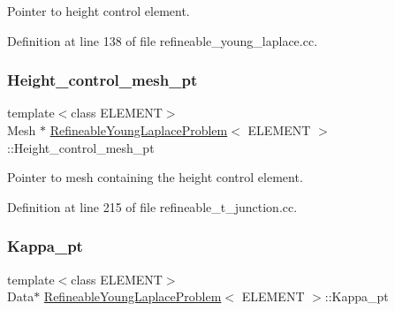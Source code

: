 Pointer to height control element. 



Definition at line 138 of file refineable\+\_\+young\+\_\+laplace.\+cc.

\mbox{\label{classRefineableYoungLaplaceProblem_ae2ae72b9b685c052b6a86892f64c2d85}} 
\subsubsection{\texorpdfstring{Height\+\_\+control\+\_\+mesh\+\_\+pt}{Height\_control\_mesh\_pt}}
{\footnotesize\ttfamily template$<$class E\+L\+E\+M\+E\+NT$>$ \\
Mesh $\ast$ \hyperlink{classRefineableYoungLaplaceProblem}{Refineable\+Young\+Laplace\+Problem}$<$ E\+L\+E\+M\+E\+NT $>$\+::Height\+\_\+control\+\_\+mesh\+\_\+pt\hspace{0.3cm}{\ttfamily [private]}}



Pointer to mesh containing the height control element. 



Definition at line 215 of file refineable\+\_\+t\+\_\+junction.\+cc.

\mbox{\label{classRefineableYoungLaplaceProblem_a0d667f8f0c41048740c5344619e27584}} 
\subsubsection{\texorpdfstring{Kappa\+\_\+pt}{Kappa\_pt}}
{\footnotesize\ttfamily template$<$class E\+L\+E\+M\+E\+NT$>$ \\
Data$\ast$ \hyperlink{classRefineableYoungLaplaceProblem}{Refineable\+Young\+Laplace\+Problem}$<$ E\+L\+E\+M\+E\+NT $>$\+::Kappa\+\_\+pt\hspace{0.3cm}{\ttfamily [private]}}




